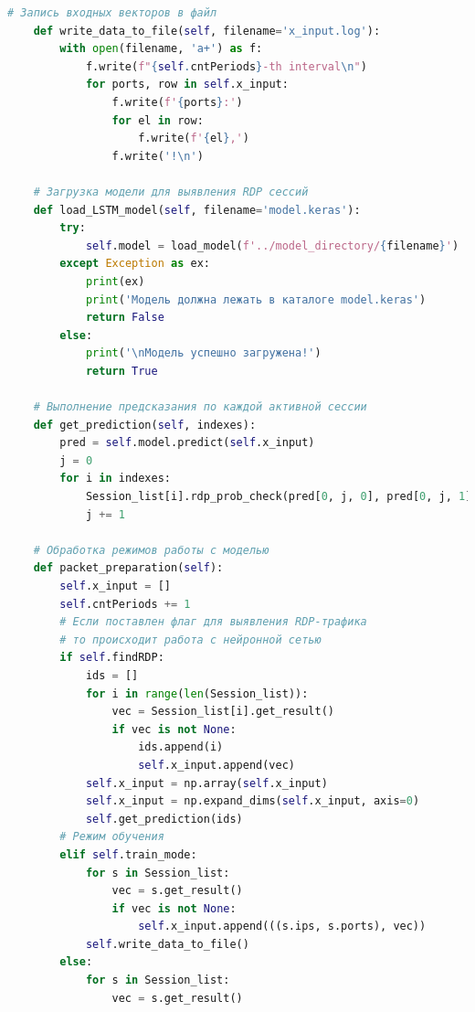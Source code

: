 \documentclass[bachelor, och, coursework]{SCWorks}
\begin{document}
\begin{lstlisting}[language=Python]
    # Запись входных векторов в файл
    def write_data_to_file(self, filename='x_input.log'):
        with open(filename, 'a+') as f:
            f.write(f"{self.cntPeriods}-th interval\n")
            for ports, row in self.x_input:
                f.write(f'{ports}:')
                for el in row:
                    f.write(f'{el},')
                f.write('!\n')

    # Загрузка модели для выявления RDP сессий
    def load_LSTM_model(self, filename='model.keras'):
        try:
            self.model = load_model(f'../model_directory/{filename}')
        except Exception as ex:
            print(ex)
            print('Модель должна лежать в каталоге model.keras')
            return False
        else:
            print('\nМодель успешно загружена!')
            return True
    
    # Выполнение предсказания по каждой активной сессии
    def get_prediction(self, indexes):
        pred = self.model.predict(self.x_input)
        j = 0
        for i in indexes:
            Session_list[i].rdp_prob_check(pred[0, j, 0], pred[0, j, 1])
            j += 1

    # Обработка режимов работы с моделью
    def packet_preparation(self):
        self.x_input = []
        self.cntPeriods += 1
        # Если поставлен флаг для выявления RDP-трафика
        # то происходит работа с нейронной сетью
        if self.findRDP:
            ids = []
            for i in range(len(Session_list)):
                vec = Session_list[i].get_result()
                if vec is not None:
                    ids.append(i)
                    self.x_input.append(vec)
            self.x_input = np.array(self.x_input)
            self.x_input = np.expand_dims(self.x_input, axis=0)
            self.get_prediction(ids)
        # Режим обучения
        elif self.train_mode:
            for s in Session_list:
                vec = s.get_result()
                if vec is not None:
                    self.x_input.append(((s.ips, s.ports), vec))
            self.write_data_to_file()
        else:
            for s in Session_list:
                vec = s.get_result()


\end{lstlisting}
\end{document}
